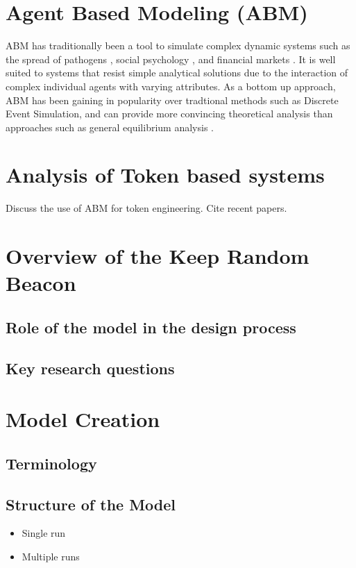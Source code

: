 \documentclass[conference]{IEEEtran}
\begin{document}
\section{Agent Based Modeling (ABM)}
ABM has traditionally been a tool to simulate complex dynamic systems 
such as the spread of pathogens \cite{Bauer2009}, social psychology 
\cite{Smith2007}, and financial markets \cite{Feng2012}. It is well suited
to systems that resist simple analytical solutions due to the interaction of 
complex individual agents with varying attributes. As a bottom up approach, ABM
has been gaining in popularity over tradtional methods such as Discrete Event
Simulation, and can provide more convincing theoretical analysis than approaches
such as general equilibrium analysis \cite{Wang2018}.

\section{Analysis of Token based systems}


Discuss the use of ABM for token engineering. Cite recent papers.

\section{Overview of the Keep Random Beacon}

\subsection{Role of the model in the design process}

\subsection{Key research questions}

\section{Model Creation}

\subsection{Terminology}

\subsection{Structure of the Model}
\begin{itemize}

\item Single run
\item Multiple runs
    
\end{itemize}
\end{document}
